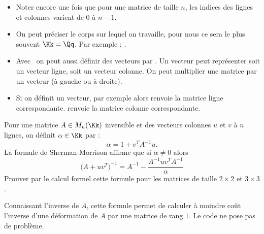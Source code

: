 \documentclass[class=report,crop=false]{standalone}
\begin{document}
\begin{remarque*}
\sauteligne
\begin{itemize}
  \item Noter encore une fois que pour une matrice de taille $n$, les indices des lignes et colonnes 
  varient de $0$ à $n-1$.

  \item On peut préciser le corps sur lequel on travaille, 
  pour nous ce sera le plus souvent $\Kk = \Qq$. Par exemple :
  .
  
  \item Avec \Sage\ on peut aussi définir des vecteurs par
  .
  Un vecteur peut représenter soit un vecteur ligne, 
  soit un vecteur colonne. On peut multiplier une matrice 
  par un vecteur (à gauche ou à droite).
   
  \item Si on définit un vecteur, par exemple  
   alors 
   renvoie la matrice ligne correspondante.
   renvoie la matrice colonne correspondante.   
\end{itemize}
\end{remarque*}

\begin{tp}
Pour une matrice $A \in M_n(\Kk)$ inversible et des vecteurs colonnes $u$ et $v$ à $n$ lignes,
on définit $\alpha \in \Kk$ par : 
$$\alpha  = 1 + v^T A^{-1} u.$$
La formule de Sherman-Morrison affirme que si $\alpha\neq0$ alors
$$\bigg(A+u v^T\bigg)^{-1} = A^{-1} - \frac{A^{-1}u v^T A^{-1}}{\alpha}$$
Prouver par le calcul formel cette formule pour les matrices de taille 
$2\times2$ et $3\times 3$.
\end{tp}

Connaissant l'inverse de $A$, cette formule permet de calculer 
à moindre coût l'inverse d'une déformation de $A$ 
par une matrice de rang $1$.
Le code ne pose pas de problème. 

 
\end{document}

